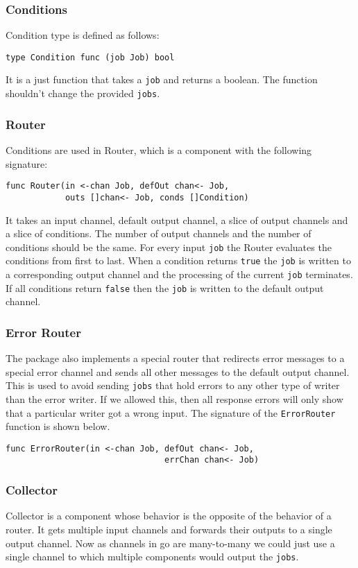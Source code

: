 \subsubsection{Conditions}
Condition type is defined as follows:
\begin{lstlisting}
type Condition func (job Job) bool
\end{lstlisting}
It is a just function that takes a \texttt{job} and returns a boolean.
The function shouldn't change the provided \texttt{jobs}.

\subsubsection{Router}
Conditions are used in Router, which is a component with the 
following signature:
\begin{lstlisting}
func Router(in <-chan Job, defOut chan<- Job, 
            outs []chan<- Job, conds []Condition)
\end{lstlisting}
It takes an input channel, default output channel, a slice of output channels 
and a slice of conditions.
The number of output channels and the number of conditions should be the same.
For every input \texttt{job} the Router evaluates the conditions from first to last.
When a condition returns \texttt{true} the \texttt{job} is written to a 
corresponding output channel 
and the processing of the current \texttt{job} terminates. If all conditions 
return \texttt{false} then the \texttt{job} is written to the default output channel.

\subsubsection{Error Router}
The package also implements a special router that redirects error messages
to a special error channel and sends all other messages to the default output 
channel. This is used to avoid sending \texttt{jobs} that hold errors to 
any other type of writer than the error writer. If we allowed this, then
all response errors will only show that a particular writer got a wrong input.
The signature of the \texttt{ErrorRouter} function is shown below.
\begin{lstlisting}
func ErrorRouter(in <-chan Job, defOut chan<- Job, 
                                errChan chan<- Job)
\end{lstlisting}

\subsubsection{Collector}
Collector is a component whose behavior is the opposite of the behavior 
of a router. It gets multiple input channels
and forwards their outputs to a single output channel. Now as channels
in go are many-to-many we could just use a single channel to which
multiple components would output the \texttt{jobs}. 

